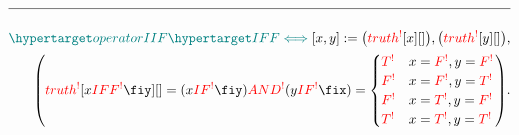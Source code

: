 \documentclass[a4paper]{article}
\makeatletter
\def\ml{\mleft}
\def\mr{\mright}
\newcommand{\defeq}{:=}
\newcommand{\cusand}{,}
\newcommand{\cuspop}{.}
\newcommand{\eqComment}[1]{\text{  \# #1}}
\newcommand{\n}{\\[1.5ex] \hline \nonumber \\[0ex]}
\newcommand{\m}{\nonumber \\}
\newcommand{\rfrNEW}[1]{%
  \hyperlink{#1}{\csname #1\endcsname}%
  }
\newcommand{\rfr}[1]{%
  \ifcsname#1\endcsname%
    \rfrNEW{#1}%
  \else%
    \textcolor{red}{#1^!}%
  \fi%
}
\newcommand\rfrlist[1]{%
    \forcsvlist{\rfrlist@item}{#1}
}
\newcommand\rfrlist@item[1]{\rfr{#1}\\}
\newcommand{\thmlink}[2]{{}_{\substack{\rfrlist{#1}}}^{\dfn{#2}} }
\makeatother
\begin{document}
\begin{tcolorbox}
\begin{align}
\n \dfn{operatorIIF} [\dfn{IFF}[\iff]][x, y] \defeq \ml(\rfr{truth} [x][]\mr) \cusand \ml(\rfr{truth} [y][]\mr) \cusand 
\m \ml(\rfr{truth} [x \rfr{IFF} y][] = (x \rfr{IF} y) \rfr{AND} (y \rfr{IF} x) = \begin{cases} \rfr{T} & x = \rfr{F} \cusand y = \rfr{F} \\ \rfr{F} & x = \rfr{F} \cusand y = \rfr{T} \\ \rfr{F} & x = \rfr{T} \cusand y = \rfr{F} \\ \rfr{T} & x = \rfr{T} \cusand y = \rfr{T} \end{cases}\mr) \cuspop
\end{align}
\end{tcolorbox}

\begin{comment}

\subsection{Boolean Algebra Properties}
\begin{tcolorbox}[breakable, enhanced]
\begin{align}
   \thmlink{POS-LCom}{THM-Dual-1} \Bigg(\rfrOLD{booleanAlgebra}[\{\rfrOLD{T}, \rfrOLD{F}\}, \rfrOLD{\land}, \rfrOLD{\lor}, \rfrOLD{\lnot}][] \rfrOLD{\iff}
\m \ml(\ml(x \rfrOLD{\lor} y = y \rfrOLD{\lor} x\mr) \cusand \ml(x \rfrOLD{\land} y = y \rfrOLD{\land} x\mr)\mr) \eqComment{Reordered Commutative} \cusand
\m \ml(\ml(x \rfrOLD{\lor} \ml(y \rfrOLD{\land} z\mr) = \ml(x \rfrOLD{\lor} y\mr) \rfrOLD{\land} \ml(x \rfrOLD{\lor} z\mr)\mr) \cusand \ml(x \rfrOLD{\land} \ml(y \rfrOLD{\lor} z\mr) = \ml(x \rfrOLD{\land} y\mr) \rfrOLD{\lor} \ml(x \rfrOLD{\land} z\mr)\mr)\mr) \eqComment{Reordered Distributive} \cusand
\m \ml(\ml(x \rfrOLD{\lor} \rfrOLD{F} = x\mr) \cusand \ml(x \rfrOLD{\land} \rfrOLD{T} = x\mr)\mr) \eqComment{Reordered Identity} \cusand
\m \ml(\ml(x \rfrOLD{\lor} \rfrOLD{\lnot} x = \rfrOLD{T}\mr) \cusand \ml(x \rfrOLD{\land} \rfrOLD{\lnot} x = \rfrOLD{F}\mr)\mr) \eqComment{Reordered Complement} \cuspop \rfrOLD{\iff}
\m \rfrOLD{booleanAlgebra}[\{\rfrOLD{F}, \rfrOLD{T}\}, \rfrOLD{\lor}, \rfrOLD{\land}, \rfrOLD{\lnot}][]\Bigg)
\m \thmlink{THM-Dual-1}{THM-Dual} \ml(\rfrOLD{booleanAlgebra}[\{\rfrOLD{T}, \rfrOLD{F}\}, \rfrOLD{\land}, \rfrOLD{\lor}, \rfrOLD{\lnot}][] \rfrOLD{\iff} \rfrOLD{booleanAlgebra}[\{\rfrOLD{F}, \rfrOLD{T}\}, \rfrOLD{\lor}, \rfrOLD{\land}, \rfrOLD{\lnot}][]\mr)
\m \eqComment{Boolean Algebra Duality follows from the swap symmetry of $\ml(\rfrOLD{\land}, \rfrOLD{T}\mr)$ and $\ml(\rfrOLD{\lor}, \rfrOLD{F}\mr)$ within the axioms}

\end{comment}
\end{document}
